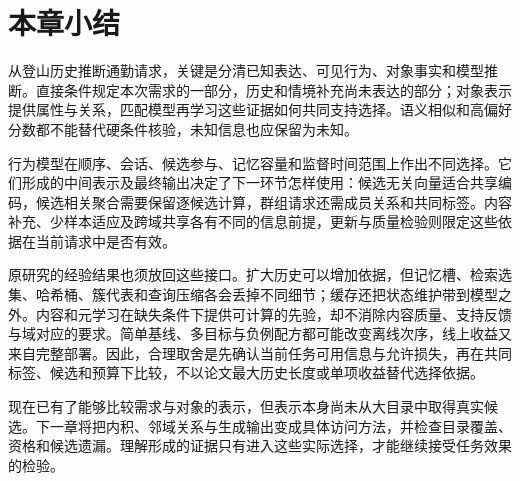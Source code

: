 \section{本章小结}
\label{sec:rs-understanding-summary}

从登山历史推断通勤请求，关键是分清已知表达、可见行为、对象事实和模型推断。直接条件规定本次需求的一部分，历史和情境补充尚未表达的部分；对象表示提供属性与关系，匹配模型再学习这些证据如何共同支持选择。语义相似和高偏好分数都不能替代硬条件核验，未知信息也应保留为未知。

行为模型在顺序、会话、候选参与、记忆容量和监督时间范围上作出不同选择。它们形成的中间表示及最终输出决定了下一环节怎样使用：候选无关向量适合共享编码，候选相关聚合需要保留逐候选计算，群组请求还需成员关系和共同标签。内容补充、少样本适应及跨域共享各有不同的信息前提，更新与质量检验则限定这些依据在当前请求中是否有效。

原研究的经验结果也须放回这些接口。扩大历史可以增加依据，但记忆槽、检索选集、哈希桶、簇代表和查询压缩各会丢掉不同细节；缓存还把状态维护带到模型之外。内容和元学习在缺失条件下提供可计算的先验，却不消除内容质量、支持反馈与域对应的要求。简单基线、多目标与负例配方都可能改变离线次序，线上收益又来自完整部署。因此，合理取舍是先确认当前任务可用信息与允许损失，再在共同标签、候选和预算下比较，不以论文最大历史长度或单项收益替代选择依据。

现在已有了能够比较需求与对象的表示，但表示本身尚未从大目录中取得真实候选。下一章将把内积、邻域关系与生成输出变成具体访问方法，并检查目录覆盖、资格和候选遗漏。理解形成的证据只有进入这些实际选择，才能继续接受任务效果的检验。
